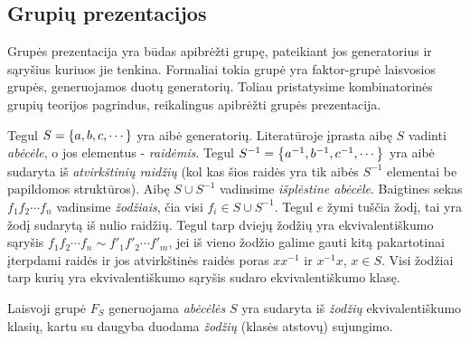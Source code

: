 
\subsection{Grupių prezentacijos}

Grupės prezentacija yra būdas apibrėžti grupę,
pateikiant jos generatorius ir sąryšius kuriuos jie tenkina.
Formaliai tokia grupė yra faktor-grupė laisvosios grupės,
generuojamos duotų generatorių.
Toliau pristatysime kombinatorinės grupių teorijos pagrindus,
reikalingus apibrėžti grupės prezentacija.

Tegul $S = \qty{a,b,c,\cdots}$ yra aibė generatorių.
Literatūroje įprasta aibę $S$ vadinti \emph{abėcėle}, 
o jos elementus - \emph{raidėmis}.
Tegul $S^{-1} = \qty{a^{-1},b^{-1},c^{-1},\cdots}$
yra aibė sudaryta iš \emph{atvirkštinių raidžių}
(kol kas šios raidės yra tik aibės $S^{-1}$ elementai be papildomos struktūros).
Aibę $S \cup S^{-1}$ vadinsime \emph{išplėstine abėcėle}.
Baigtines sekas $ f_1 f_2 \cdots f_n$ vadinsime \emph{žodžiais},
čia visi $f_i \in S \cup S^{-1}$.
Tegul $e$ žymi tuščia žodį,
tai yra žodį sudarytą iš nulio raidžių.
Tegul tarp dviejų žodžių yra ekvivalentiškumo sąryšis
$f_1 f_2 \cdots f_n \sim f'_1 f'_2 \cdots f'_m$,
jei iš vieno žodžio galime gauti kitą
pakartotinai įterpdami raidės ir jos atvirkštinės raidės poras $xx^{-1}$ ir $x^{-1}x$, $x \in S$.
Visi žodžiai tarp kurių yra ekvivalentiškumo sąryšis sudaro ekvivalentiškumo klasę.
\begin{definition}
	Laisvoji grupė $F_S$ generuojama \emph{abėcėlės} $S$ yra sudaryta iš
	\emph{žodžių} ekvivalentiškumo klasių,
	kartu su daugyba duodama \emph{žodžių} (klasės atstovų) sujungimo.
\end{definition}

